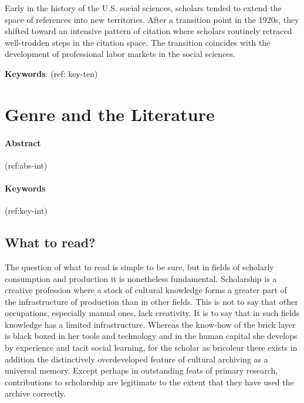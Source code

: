 \documentclass[]{book}
\theoremstyle{definition}
\theoremstyle{definition}
\theoremstyle{definition}
\theoremstyle{remark}
\begin{document}
Early in the history of the U.S. social sciences, scholars
tended to extend the space of references into new territories. After a
transition point in the 1920s, they shifted toward an intensive pattern
of citation where scholars routinely retraced well-trodden steps in the
citation space. The transition coincides with the development of
professional labor markets in the social sciences.




\textbf{Keywords}: (ref: key-ten)

\hypertarget{int}{%
\chapter{Genre and the Literature}\label{int}}

\hypertarget{abstract}{%
\subsubsection*{Abstract}\label{abstract}}


(ref:abs-int)

\hypertarget{keywords}{%
\subsubsection*{Keywords}\label{keywords}}


(ref:key-int)

\hypertarget{what-to-read}{%
\section{What to read?}\label{what-to-read}}

The question of what to read is simple to be sure, but in fields of
scholarly consumption and production it is nonetheless fundamental.
Scholarship is a creative profession where a stock of cultural knowledge
forms a greater part of the infrastructure of production than in other
fields. This is not to say that other occupations, especially manual
ones, lack creativity. It is to say that in such fields knowledge has a
limited infrastructure. Whereas the know-how of the brick layer is black
boxed in her tools and technology and in the human capital she develops
by experience and tacit social learning, for the scholar as bricoleur
there exists in addition the distinctively overdeveloped feature of
cultural archiving as a universal memory. Except perhaps in outstanding
feats of primary research, contributions to scholarship are legitimate
to the extent that they have used the archive correctly.
\end{document}
